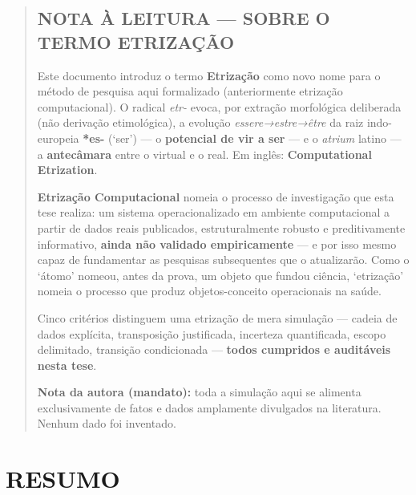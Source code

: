 \documentclass[
  12pt,
]{report}
\begin{document}
\begin{quote}
\hypertarget{nota-uxe0-leitura-sobre-o-termo-etrizauxe7uxe3o-1}{%
\subsection{NOTA À LEITURA --- SOBRE O TERMO
ETRIZAÇÃO}\label{nota-uxe0-leitura-sobre-o-termo-etrizauxe7uxe3o-1}}

Este documento introduz o termo \textbf{Etrização} como novo nome para o
método de pesquisa aqui formalizado (anteriormente etrização
computacional). O radical \emph{etr-} evoca, por extração morfológica
deliberada (não derivação etimológica), a evolução
\emph{essere→estre→être} da raiz indo-europeia \textbf{*es-} (`ser') ---
o \textbf{potencial de vir a ser} --- e o \emph{atrium} latino --- a
\textbf{antecâmara} entre o virtual e o real. Em inglês:
\textbf{Computational Etrization}.

\textbf{Etrização Computacional} nomeia o processo de investigação que
esta tese realiza: um sistema operacionalizado em ambiente computacional
a partir de dados reais publicados, estruturalmente robusto e
preditivamente informativo, \textbf{ainda não validado empiricamente}
--- e por isso mesmo capaz de fundamentar as pesquisas subsequentes que
o atualizarão. Como o `átomo' nomeou, antes da prova, um objeto que
fundou ciência, `etrização' nomeia o processo que produz
objetos-conceito operacionais na saúde.

Cinco critérios distinguem uma etrização de mera simulação --- cadeia de
dados explícita, transposição justificada, incerteza quantificada,
escopo delimitado, transição condicionada --- \textbf{todos cumpridos e
auditáveis nesta tese}.

\textbf{Nota da autora (mandato):} toda a simulação aqui se alimenta
exclusivamente de fatos e dados amplamente divulgados na literatura.
Nenhum dado foi inventado.
\end{quote}

\hypertarget{resumo}{%
\section{RESUMO}\label{resumo}}
\end{document}
